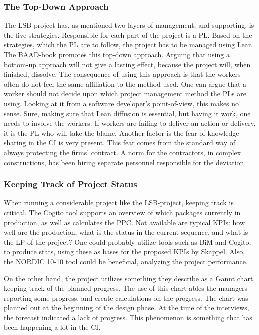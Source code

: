 \subsubsection{The Top-Down Approach}
The LSB-project has, as mentioned two layers of management, and supporting, is the five strategies. Responsible for each part of the project is a PL. Based on the strategies, which the PL are to follow, the project has to be managed using Lean. The BAAD-book promotes this top-down approach. Arguing that using a bottom-up approach will not give a lasting effect, because the project will, when finished, dissolve. The consequence of using this approach is that the workers often do not feel the same affiliation to the method used. One can argue that a worker should not decide upon which project management method the PLs are using. Looking at it from a software developer's point-of-view, this makes no sense. Sure, making sure that Lean diffusion is essential, but having it work, one needs to involve the workers. If workers are failing to deliver an action or delivery, it is the PL who will take the blame. Another factor is the fear of knowledge sharing in the CI is very present. This fear comes from the standard way of always protecting the firms' contract. A norm for the contractors, in complex constructions, has been hiring separate personnel responsible for the deviation. 

\subsubsection{Keeping Track of Project Status}
When running a considerable project like the LSB-project, keeping track is critical. The Cogito tool supports an overview of which packages currently in production, as well as calculates the PPC. Not available are typical KPIs: how well are the production, what is the status in the current sequence, and what is the LP of the project? One could probably utilize tools such as BiM and Cogito, to produce stats, using these as bases for the proposed KPIs by Skappel. Also, the NORDIC 10-10 tool could be beneficial, analyzing the project performance.

On the other hand, the project utilizes something they describe as a Gannt chart, keeping track of the planned progress. The use of this chart ables the managers reporting some progress, and create calculations on the progress. The chart was planned out at the beginning of the design phase. At the time of the interviews, the forecast indicated a lack of progress. This phenomenon is something that has been happening a lot in the CI. 

